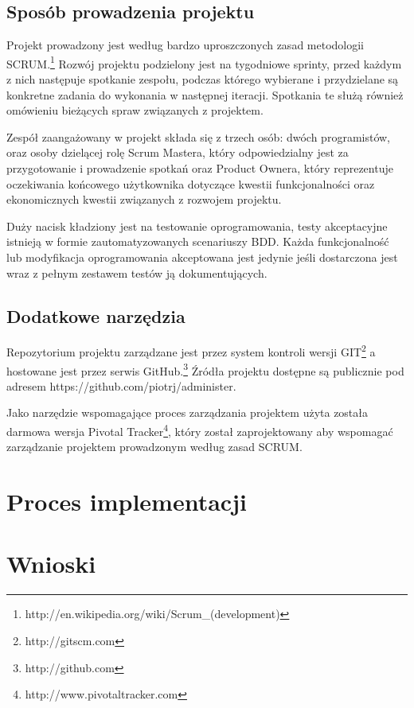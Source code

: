  \subsection{Sposób prowadzenia projektu}
  Projekt prowadzony jest według bardzo uproszczonych zasad metodologii SCRUM.\footnote{http://en.wikipedia.org/wiki/Scrum\_(development)} Rozwój projektu podzielony jest na tygodniowe sprinty, przed każdym z nich następuje spotkanie zespołu, podczas którego wybierane i przydzielane są konkretne zadania do wykonania w następnej iteracji. Spotkania te służą również omówieniu bieżących spraw związanych z projektem.
  
  Zespół zaangażowany w projekt składa się z trzech osób: dwóch programistów, oraz osoby dzielącej rolę Scrum Mastera, który odpowiedzialny jest za przygotowanie i prowadzenie spotkań oraz Product Ownera, który reprezentuje oczekiwania końcowego użytkownika dotyczące kwestii funkcjonalności oraz ekonomicznych kwestii związanych z rozwojem projektu.
  
  Duży nacisk kładziony jest na testowanie oprogramowania, testy akceptacyjne istnieją w formie zautomatyzowanych scenariuszy BDD. Każda funkcjonalność lub modyfikacja oprogramowania akceptowana jest jedynie jeśli dostarczona jest wraz z pełnym zestawem testów ją dokumentujących.
  
  \subsection{Dodatkowe narzędzia}
  Repozytorium projektu zarządzane jest przez system kontroli wersji GIT\footnote{http://git\-scm.com} a hostowane jest przez serwis GitHub.\footnote{http://github.com} Źródła projektu dostępne są publicznie pod adresem https://github.com/piotrj/administer.
  
  Jako narzędzie wspomagające proces zarządzania projektem użyta została darmowa wersja Pivotal Tracker\footnote{http://www.pivotaltracker.com}, który został zaprojektowany aby wspomagać zarządzanie projektem prowadzonym według zasad SCRUM.
  
  \section{Proces implementacji}
  \section{Wnioski}
